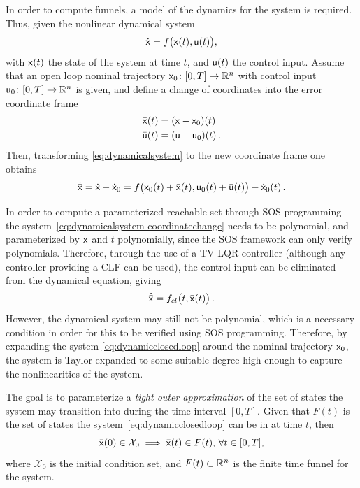 In order to compute funnels, a model of the dynamics for the system is required.
Thus, given the nonlinear dynamical system
\begin{equation}
  \label{eq:dynamicalsystem}
  \dot{{\mathbf{\mathsf{x}}}} = f\big({\mathbf{\mathsf{x}}}(t), {\mathbf{\mathsf{u}}}(t) \big),
\end{equation}
with \({\mathbf{\mathsf{x}}}(t)\) the state of the system at time \(t\), and \({\mathbf{\mathsf{u}}}(t)\)
the control input. Assume that an open loop nominal trajectory \({\mathbf{\mathsf{x}}}_0
\colon [0,T] \rightarrow \mathbb{R}^n\) with control input \({\mathbf{\mathsf{u}}}_0 \colon [0,T]
\rightarrow \mathbb{R}^n\) is given, and define a change of coordinates into the error
coordinate frame
\begin{align}
  \label{eq:system-error-dynamics}
  \bar{{\mathbf{\mathsf{x}}}}(t) &= ( {\mathbf{\mathsf{x}}} - {\mathbf{\mathsf{x}}}_0 )(t) \\
  \bar{{\mathbf{\mathsf{u}}}}(t) &= ({\mathbf{\mathsf{u}}} - {\mathbf{\mathsf{u}}}_0 )(t) \, .
\end{align}
Then, transforming \cref{eq:dynamicalsystem} to the new coordinate frame one
obtains
\begin{equation}
  \label{eq:dynamicalsystem-coordinatechange}
  \dot{\bar{{\mathbf{\mathsf{x}}}}} = \dot{{\mathbf{\mathsf{x}}}} - \dot{{\mathbf{\mathsf{x}}}}_0 = f\big( {\mathbf{\mathsf{x}}}_0(t) + \bar{{\mathbf{\mathsf{x}}}}(t), {\mathbf{\mathsf{u}}}_0(t) + \bar{{\mathbf{\mathsf{u}}}}(t) \big) - \dot{{\mathbf{\mathsf{x}}}}_0(t) \, .
\end{equation}

In order to compute a parameterized reachable set through \ac{SOS} programming
the system~\cref{eq:dynamicalsystem-coordinatechange} needs to be polynomial,
and parameterized by \({\mathbf{\mathsf{x}}}\) and \(t\) polynomially, since the \ac{SOS}
framework can only verify polynomials. Therefore, through the use of a
\ac{TV-LQR} controller (although any controller providing a \ac{CLF} can be
used), the control input can be eliminated from the dynamical equation, giving
\begin{equation}
  \label{eq:dynamicclosedloop}
  \dot{\bar{{\mathbf{\mathsf{x}}}}} = f_{cl}\big( t,\bar{{\mathbf{\mathsf{x}}}}(t) \big) \, .
\end{equation}
However, the dynamical system may still not be polynomial, which is a necessary
condition in order for this to be verified using \ac{SOS} programming.
Therefore, by expanding the system \cref{eq:dynamicclosedloop} around the
nominal trajectory \({\mathbf{\mathsf{x}}}_0\), the system is Taylor expanded to some
suitable degree high enough to capture the nonlinearities of the system.

The goal is to parameterize a \textit{tight outer approximation} of the set of
states the system may transition into during the time interval \([0,T]\). Given
that \(F(t)\) is the set of states the system~\cref{eq:dynamicclosedloop} can be
in at time \(t\), then
\begin{equation}
  \label{eq:reachableset}
  \bar{{\mathbf{\mathsf{x}}}}(0) \in \mathcal{X}_0 \implies \bar{{\mathbf{\mathsf{x}}}}(t) \in F(t), \, \forall t \in [0,T],
\end{equation}
where \(\mathcal{X}_0\) is the initial condition set, and \(F(t) \subset \mathbb{R}^n\)
is the finite time funnel for the system.

